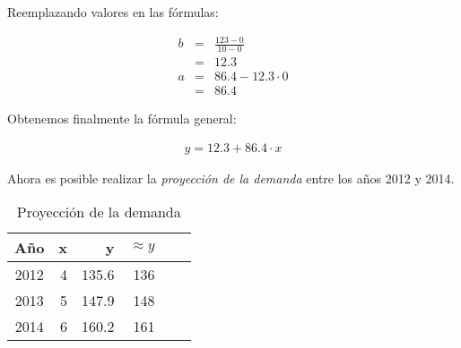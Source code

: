 \begin{enumerate}[(a)]
          Reemplazando valores en las fórmulas:
    
          \begin{eqnarray}
              b &=& \frac{123 - 0}{10 - 0} \nonumber \\
                &=& 12.3  \\
              a &=& 86.4 - 12.3\cdot 0 \nonumber \\
                &=& 86.4
          \end{eqnarray}

          Obtenemos finalmente la fórmula general:

          \begin{eqnarray}
              y = 12.3 + 86.4\cdot x 
          \end{eqnarray}

          Ahora es posible realizar la \emph{proyección de la demanda} entre los años 2012 y 2014.
        
          \begin{table}[h!t]
            \centering
            \begin{tabular}{|c|r|r|r|r|r|}
                \hline
                {\bf Año} & {\bf x} & {\bf y} & {\bf $\approx y$}\\ \hline
                2012      & 4       & 135.6   & 136  \\
                2013      & 5       & 147.9   & 148  \\
                2014      & 6       & 160.2   & 161  \\ \hline
            \end{tabular}
            \caption{Proyección de la demanda}
            \label{tab:demanda}
          \end{table}            

        \begin{center}
        \end{center}


\end{enumerate}
